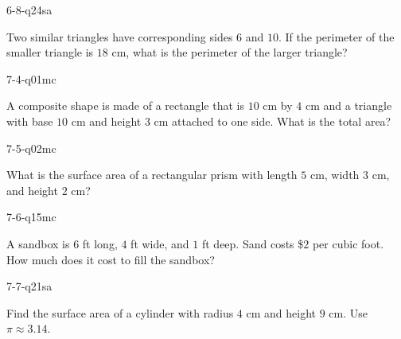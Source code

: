\begin{practiceQuestion}{6-8-q24}{sa}
\begin{questionText}
Two similar triangles have corresponding sides $6$ and $10$. If the perimeter of the smaller triangle is $18$ cm, what is the perimeter of the larger triangle?
\end{questionText}
\end{practiceQuestion}

\begin{practiceQuestion}{7-4-q01}{mc}
\begin{questionText}
A composite shape is made of a rectangle that is $10$ cm by $4$ cm and a triangle with base $10$ cm and height $3$ cm attached to one side. What is the total area?
\end{questionText}
\end{practiceQuestion}

\begin{practiceQuestion}{7-5-q02}{mc}
\begin{questionText}
What is the surface area of a rectangular prism with length $5$ cm, width $3$ cm, and height $2$ cm?
\end{questionText}
\end{practiceQuestion}

\begin{practiceQuestion}{7-6-q15}{mc}
\begin{questionText}
A sandbox is $6$ ft long, $4$ ft wide, and $1$ ft deep. Sand costs \$$2$ per cubic foot. How much does it cost to fill the sandbox?
\end{questionText}
\end{practiceQuestion}

\begin{practiceQuestion}{7-7-q21}{sa}
\begin{questionText}
Find the surface area of a cylinder with radius $4$ cm and height $9$ cm. Use $\pi \approx 3.14$.
\end{questionText}
\end{practiceQuestion}

